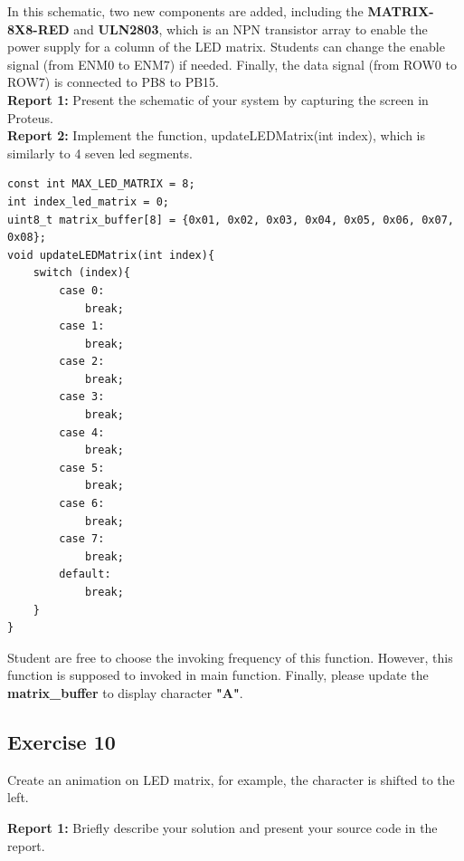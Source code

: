 In this schematic, two new components are added, including the \textbf{MATRIX-8X8-RED} and \textbf{ULN2803}, which is an NPN transistor array to enable the power supply for a column of the LED matrix. Students can change the enable signal (from ENM0 to  ENM7) if needed. Finally, the data signal (from ROW0 to ROW7) is connected to PB8 to PB15. \\

\textbf{Report 1: } Present the schematic of your system by capturing the screen in Proteus.\\

\textbf{Report 2: } Implement the function, updateLEDMatrix(int index), which is similarly  to 4 seven led segments.

\begin{lstlisting}[caption=Function to display data on LED Matrix]
const int MAX_LED_MATRIX = 8;
int index_led_matrix = 0;
uint8_t matrix_buffer[8] = {0x01, 0x02, 0x03, 0x04, 0x05, 0x06, 0x07, 0x08};
void updateLEDMatrix(int index){
    switch (index){
        case 0:
            break;
        case 1:
            break;
        case 2:
            break;
        case 3:
            break;
        case 4:
            break;
        case 5:
            break;
        case 6:
            break;
        case 7:
            break;
        default:
            break;
    }
}
\end{lstlisting}

Student are free to choose the invoking frequency of this function. However, this function is supposed to invoked in main function. Finally, please update the \textbf{matrix\_buffer} to display character \textbf{"A"}.

\subsection{Exercise 10}
Create an animation on LED matrix, for example, the character is shifted to the left. 

\textbf{Report 1: } Briefly describe your solution and present your source code in the report.
